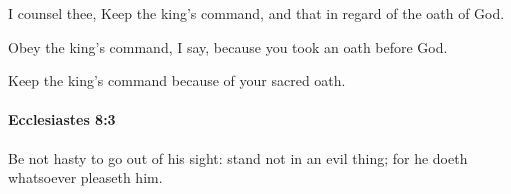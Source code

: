 			\begin{versebox}
					\item[BHS] 
					\item[LXX] 
					\item[ASV] I counsel thee, Keep the king's command, and that in regard of the oath of God.
					\item[NIV] Obey the king’s command, I say, because you took an oath before God.
					\item[NRSV] Keep the king’s command because of your sacred oath.
			\end{versebox}

		\paragraph{Ecclesiastes 8:3} %
			\label{ECCLESIASTES-8-3}

			Be not hasty to go out of his sight: stand not in an evil thing; for he doeth whatsoever pleaseth him.

